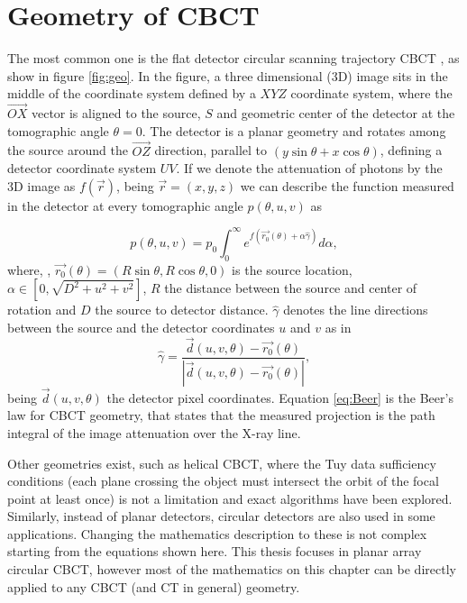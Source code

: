 \section{Geometry of CBCT}

The most common one is the flat detector circular scanning trajectory CBCT , as show in figure \ref{fig:geo}. In the figure, a three dimensional (3D) image sits in the middle  of the coordinate system defined by a $XYZ$ coordinate system, where the $\overrightarrow{OX}$ vector is aligned to the source, $S$ and geometric center of the detector at the tomographic angle $\theta=0$. The detector is a planar geometry and rotates among the source around the $\overrightarrow{OZ}$ direction, parallel to $(y \sin \theta+x\cos \theta)$, defining a detector coordinate system $UV$. If we denote the attenuation of photons by the 3D image as $ f(\vec r)$, being $\vec r =(x,y,z)$ we can describe the function measured in the detector at every tomographic angle $p(\theta,u,v)$ as 

\begin{equation}
p(\theta,u,v)= p_0\int_{0}^{\infty} {e^{f(\vec{r_0} (\theta)+\alpha\hat{\gamma})}d\alpha},
\label{eq:Beer}
\end{equation} 
where, , $\vec{r_0} (\theta)=(R \sin\theta, R \cos \theta,0)$ is the source location, $\alpha \in [0,\sqrt{D^2+u^2+v^2}]$, $R$ the distance between the source and center of rotation and $D$ the source to detector distance. $\hat{\gamma}$ denotes the line directions between the source and the detector coordinates $u$ and $v$ as in
 \begin{equation}
\hat{\gamma}=\frac{\vec{d}(u,v,\theta) -\vec{r_0} (\theta) }{\left | \vec{d}(u,v,\theta) -\vec{r_0} (\theta)  \right |},
\end{equation}
being $\vec{d}(u,v,\theta)$ the detector pixel coordinates. Equation \ref{eq:Beer} is the  Beer's law for CBCT geometry, that states that the measured projection is the path integral of the image attenuation over the X-ray line.  

Other geometries exist, such as helical CBCT, where the Tuy data sufficiency conditions\cite{tuy} (each plane crossing the object must intersect the orbit of the focal point at least once) is not a limitation and exact algorithms have been explored. Similarly, instead of planar detectors, circular detectors are also used in some applications. Changing the mathematics description to these is not complex starting from the equations shown here. This thesis focuses in planar array circular CBCT, however most of the mathematics on this chapter can be directly applied to any CBCT (and CT in general) geometry.

